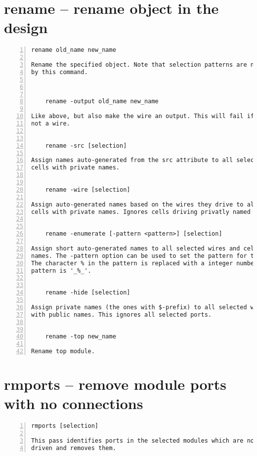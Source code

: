 \section{rename -- rename object in the design}
\label{cmd:rename}
\begin{lstlisting}[numbers=left,frame=single]
    rename old_name new_name

Rename the specified object. Note that selection patterns are not supported
by this command.



    rename -output old_name new_name

Like above, but also make the wire an output. This will fail if the object is
not a wire.


    rename -src [selection]

Assign names auto-generated from the src attribute to all selected wires and
cells with private names.


    rename -wire [selection]

Assign auto-generated names based on the wires they drive to all selected
cells with private names. Ignores cells driving privatly named wires.


    rename -enumerate [-pattern <pattern>] [selection]

Assign short auto-generated names to all selected wires and cells with private
names. The -pattern option can be used to set the pattern for the new names.
The character % in the pattern is replaced with a integer number. The default
pattern is '_%_'.


    rename -hide [selection]

Assign private names (the ones with $-prefix) to all selected wires and cells
with public names. This ignores all selected ports.


    rename -top new_name

Rename top module.
\end{lstlisting}

\section{rmports -- remove module ports with no connections}
\label{cmd:rmports}
\begin{lstlisting}[numbers=left,frame=single]
    rmports [selection]

This pass identifies ports in the selected modules which are not used or
driven and removes them.
\end{lstlisting}

